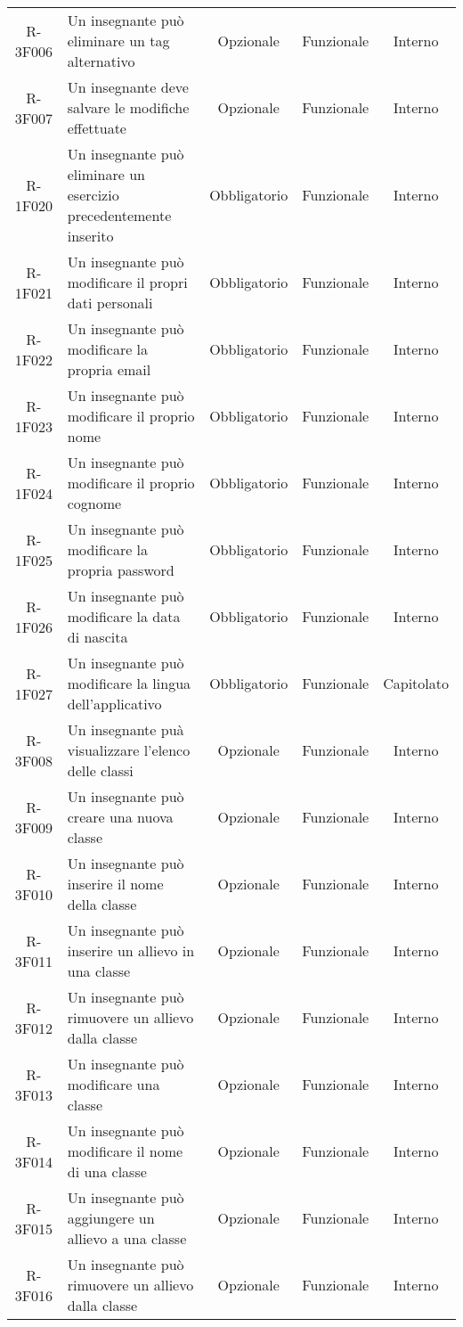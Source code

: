 \begin{tabularx}{\textwidth}{cXccc}
			R-3F006 & Un insegnante può eliminare un tag alternativo & Opzionale & Funzionale & Interno \\
			R-3F007 & Un insegnante deve salvare le modifiche effettuate & Opzionale & Funzionale & Interno \\
			R-1F020 & Un insegnante può eliminare un esercizio precedentemente inserito & Obbligatorio & Funzionale & Interno \\
			R-1F021 & Un insegnante può modificare il propri dati personali & Obbligatorio & Funzionale & Interno \\
			R-1F022 & Un insegnante può modificare la propria email & Obbligatorio & Funzionale & Interno \\
			R-1F023 & Un insegnante può modificare il proprio nome & Obbligatorio & Funzionale & Interno \\
			R-1F024 & Un insegnante può modificare il proprio cognome & Obbligatorio & Funzionale & Interno \\
			R-1F025 & Un insegnante può modificare la propria password & Obbligatorio & Funzionale & Interno \\
			R-1F026 & Un insegnante può modificare la data di nascita & Obbligatorio & Funzionale & Interno \\
			R-1F027 & Un insegnante può modificare la lingua dell'applicativo & Obbligatorio & Funzionale & Capitolato \\
			R-3F008 & Un insegnante puà visualizzare l'elenco delle classi & Opzionale & Funzionale & Interno \\
			R-3F009 & Un insegnante può creare una nuova classe & Opzionale & Funzionale & Interno \\
			R-3F010 & Un insegnante può inserire il nome della classe & Opzionale & Funzionale & Interno \\
			R-3F011 & Un insegnante può inserire un allievo in una classe & Opzionale & Funzionale & Interno \\
			R-3F012 & Un insegnante può rimuovere un allievo dalla classe & Opzionale & Funzionale & Interno \\
			R-3F013 & Un insegnante può modificare una classe & Opzionale & Funzionale & Interno \\
			R-3F014 & Un insegnante può modificare il nome di una classe & Opzionale & Funzionale & Interno \\
			R-3F015 & Un insegnante può aggiungere un allievo a una classe & Opzionale & Funzionale & Interno \\
			R-3F016 & Un insegnante può rimuovere un allievo dalla classe & Opzionale & Funzionale & Interno \\

\end{tabularx}
